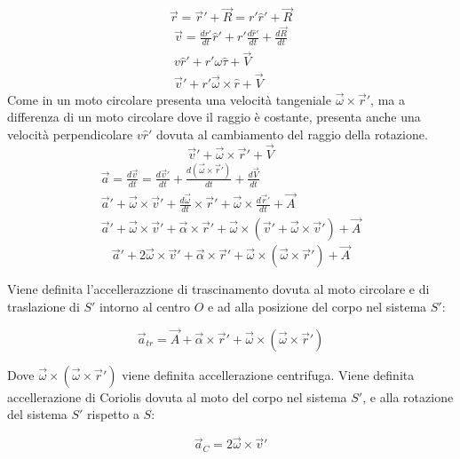 \documentclass{article}
\numberwithin{equation}{subsection}
\begin{document}
\begin{equation}
    \vec{r}=\vec{r}'+\vec{R}=r'\hat{r}'+\vec{R}
\end{equation}
\begin{gather*}
    \vec{v}=\displaystyle\frac{dr'}{dt}\hat{r}'+r'\frac{d\hat{r}'}{dt}+\frac{d\vec{R}}{dt}\\
    v\hat{r}'+r'\omega\hat{\tau}+\vec{V}\\
    \vec{v}'+r'\vec{\omega}\times\hat{r}+\vec{V}
\end{gather*}
Come in un moto circolare presenta una velocità tangeniale $\vec{\omega}\times\vec{r}'$, ma a differenza di un moto circolare dove il raggio è costante, presenta anche una 
velocità perpendicolare $v\hat{r}'$ dovuta al cambiamento del raggio della rotazione. 
\begin{equation}
    \vec{v}'+\vec{\omega}\times\vec{r}'+\vec{V}
\end{equation}
\begin{gather*}
    \vec{a}=\displaystyle\frac{d\vec{v}}{dt}=\frac{d\vec{v}'}{dt}+\frac{d(\vec{\omega}\times\vec{r}')}{dt}+\frac{d\vec{V}}{dt}\\
    \vec{a}'+\vec{\omega}\times\vec{v}'+\displaystyle\frac{d\vec{\omega}}{dt}\times\vec{r}'+\vec{\omega}\times\frac{d\vec{r}'}{dt}+\vec{A}\\
    \vec{a}'+\vec{\omega}\times\vec{v}'+\vec{\alpha}\times\vec{r}'+\vec{\omega}\times(\vec{v}'+\vec{\omega}\times\vec{v}')+\vec{A}
\end{gather*}
\begin{equation}
    \vec{a}'+2\vec{\omega}\times\vec{v}'+\vec{\alpha}\times\vec{r}'+\vec{\omega}\times(\vec{\omega}\times\vec{r}')+\vec{A}
\end{equation}

Viene definita l'accellerazzione di trascinamento dovuta al moto 
circolare e di traslazione di $S'$ intorno al centro $O$ e ad alla posizione del corpo nel sistema $S'$: 

\begin{equation}
    \vec{a}_{tr}=\vec{A}+\vec{\alpha}\times\vec{r}'+\vec{\omega}\times(\vec{\omega}\times\vec{r}')
\end{equation}

Dove $\vec{\omega}\times(\vec{\omega}\times\vec{r}')$ viene 
definita accellerazione centrifuga.
Viene definita accellerazione di Coriolis dovuta al moto del 
corpo nel sistema $S'$, e alla rotazione del sistema $S'$ rispetto a $S$:

\begin{equation}
    \vec{a}_C=2\vec{\omega}\times\vec{v}'
\end{equation}
\end{document}

